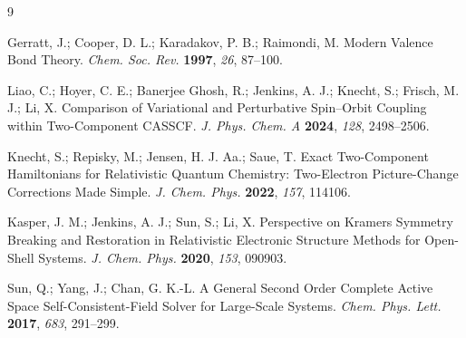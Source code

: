 \documentclass[12pt]{article}
\begin{document}
\begin{thebibliography}{9}

Gerratt, J.; Cooper, D. L.; Karadakov, P. B.; Raimondi, M.
Modern Valence Bond Theory.
\textit{Chem. Soc. Rev.} \textbf{1997}, \textit{26}, 87--100.

Liao, C.; Hoyer, C. E.; Banerjee Ghosh, R.; Jenkins, A. J.; Knecht, S.; Frisch, M. J.; Li, X.
Comparison of Variational and Perturbative Spin--Orbit Coupling within Two-Component CASSCF.
\textit{J. Phys. Chem. A} \textbf{2024}, \textit{128}, 2498--2506.

Knecht, S.; Repisky, M.; Jensen, H. J. Aa.; Saue, T.
Exact Two-Component Hamiltonians for Relativistic Quantum Chemistry: Two-Electron Picture-Change Corrections Made Simple.
\textit{J. Chem. Phys.} \textbf{2022}, \textit{157}, 114106.

Kasper, J. M.; Jenkins, A. J.; Sun, S.; Li, X.
Perspective on Kramers Symmetry Breaking and Restoration in Relativistic Electronic Structure Methods for Open-Shell Systems.
\textit{J. Chem. Phys.} \textbf{2020}, \textit{153}, 090903.

Sun, Q.; Yang, J.; Chan, G. K.-L.
A General Second Order Complete Active Space Self-Consistent-Field Solver for Large-Scale Systems.
\textit{Chem. Phys. Lett.} \textbf{2017}, \textit{683}, 291--299.

\end{thebibliography}
\end{document}
